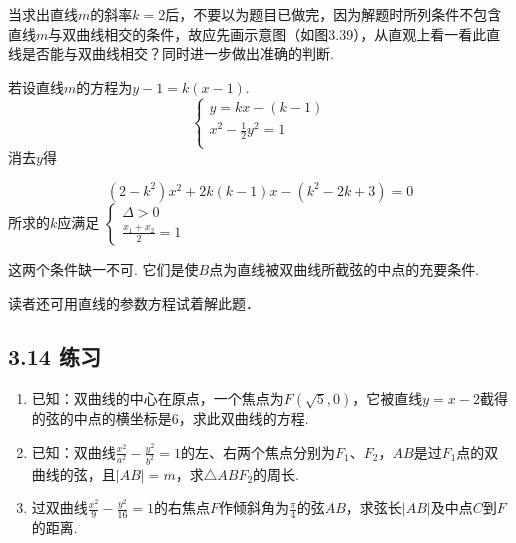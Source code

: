 \begin{remark}
\begin{enumerate}[(1)]
\noindent
\begin{minipage}{.5\textwidth}
\item 当求出直线$m$的斜率$k=2$后，不要以为题目已做完，因为解题时所列条件不包含直线$m$与双曲线相交的条件，故应先画示意图（如图3.39），从直观上看一看此直线是否能与双曲线相交？同时进一步做出准确的判断.
    \item 若设直线$m$的方程为$y-1=k(x-1)$.
\[\begin{cases}
    y=kx-(k-1)\\[1.5ex]
    x^2-\frac{1}{2}y^2=1\\
\end{cases}\]
消去$y$得
\end{minipage}
\hfill
\begin{minipage}{.45\textwidth}
\centering
{}
\end{minipage}

\[(2-k^2)x^2+2k(k-1)x-(k^2-2k+3)=0\]
所求的$k$应满足
$\begin{cases}
    \Delta >0\\[1.5ex]
    \frac{x_1+x_2}{2}=1
\end{cases}$

这两个条件缺一不可. 它们是使$B$点为直线被双曲线所截弦的中点的充要条件.
\item 读者还可用直线的参数方程试着解此题．
\end{enumerate}
\end{remark}



\subsection*{3.14 练习}
\begin{enumerate}
\item 已知：双曲线的中心在原点，一个焦点为$F(\sqrt{5},0)$，它被直线$y=x-2$截得的弦的中点的横坐标是6，求此双曲线的方程.
\item 已知：双曲线$\frac{x^2}{a^2}-\frac{y^2}{b^2}=1$的左、右两个焦点分别为$F_1$、$F_2$，$AB$是过$F_1$点的双曲线的弦，且$|AB|=m$，求$\triangle ABF_2$的周长.
\item 过双曲线$\frac{x^2}{9}-\frac{y^2}{16}=1$的右焦点$F$作倾斜角为$\frac{\pi}{4}$的弦$AB$，求弦长$|AB|$及中点$C$到$F$的距离.
\end{enumerate}

